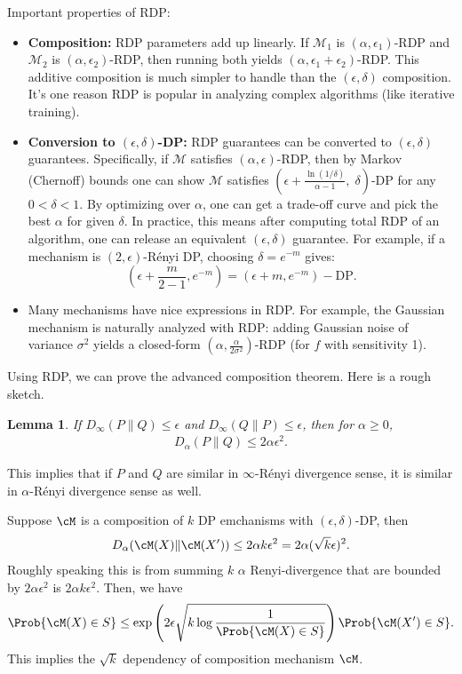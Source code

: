\documentclass[11pt, a4paper]{article}
\newtheorem{lemma}{Lemma}
\begin{document}
Important properties of RDP:
\begin{itemize}
    \item \textbf{Composition:} RDP parameters add up linearly. If $\mathcal{M}_1$ is $(\alpha,\epsilon_1)$-RDP and $\mathcal{M}_2$ is $(\alpha,\epsilon_2)$-RDP, then running both yields $(\alpha,\epsilon_1+\epsilon_2)$-RDP. This additive composition is much simpler to handle than the $(\epsilon,\delta)$ composition. It's one reason RDP is popular in analyzing complex algorithms (like iterative training).
    \item \textbf{Conversion to $(\epsilon,\delta)$-DP:} RDP guarantees can be converted to $(\epsilon,\delta)$ guarantees. Specifically, if $\mathcal{M}$ satisfies $(\alpha,\epsilon)$-RDP, then by Markov (Chernoff) bounds one can show $\mathcal{M}$ satisfies $(\epsilon + \frac{\ln(1/\delta)}{\alpha-1},\; \delta)$-DP for any $0<\delta<1$. By optimizing over $\alpha$, one can get a trade-off curve and pick the best $\alpha$ for given $\delta$. In practice, this means after computing total RDP of an algorithm, one can release an equivalent $(\epsilon,\delta)$ guarantee.
        For example, if a mechanism is $(2, \epsilon)$-Rényi DP, choosing $\delta = e^{-m}$ gives:
        \[
        (\epsilon + \frac{m}{2-1}, e^{-m}) = (\epsilon+m, e^{-m})-\text{DP}.
        \]
    \item Many mechanisms have nice expressions in RDP. For example, the Gaussian mechanism is naturally analyzed with RDP:
    adding Gaussian noise of variance $\sigma^2$ yields a closed-form $(\alpha, \frac{\alpha}{2\sigma^2})$-RDP 
    (for $f$ with sensitivity 1).
\end{itemize}

Using RDP, we can prove the advanced composition theorem.
Here is a rough sketch.
\begin{lemma}
    If $D_{\infty}(P\|Q)\leq \epsilon$ and $D_{\infty}(Q\|P)\leq \epsilon$,
    then for $\alpha\geq 0$,
    \begin{align}
        D_\alpha (P\|Q) \leq 2\alpha \epsilon^2.
    \end{align}
\end{lemma}
This implies that if $P$ and $Q$ are similar in $\infty$-Rényi divergence sense,
it is similar in $\alpha$-Rényi divergence sense as well.

Suppose $\cM$ is a composition of $k$ DP emchanisms with $(\epsilon, \delta)$-DP, then
\begin{align}
    D_{\alpha}(\cM(X)\| \cM(X'))\leq 2\alpha k\epsilon^2 = 2\alpha (\sqrt{k}\epsilon)^2.
\end{align}
Roughly speaking this is from summing $k$ $\alpha$ Renyi-divergence that are bounded by $2\alpha\epsilon^2$ is $2\alpha k\epsilon^2$.
Then, we have
\begin{align}
    \Prob{\cM(X)\in S}\leq \exp\left(2\epsilon \sqrt{k\log\frac{1}{\Prob{\cM(X)\in S}}} \right) \Prob{\cM(X')\in S}.
\end{align}
This implies the $\sqrt{k}$ dependency of composition mechanism $\cM$.
\end{document}
